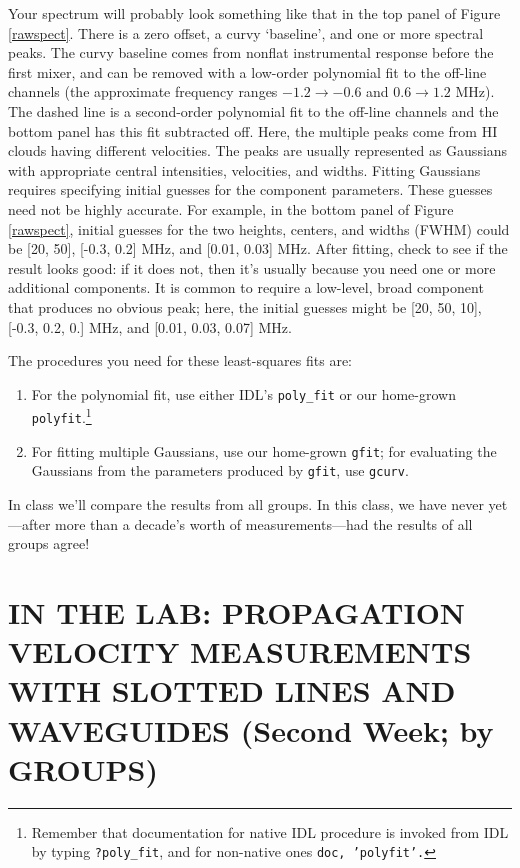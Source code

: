 \documentclass[12pt,preprint]{aastex}
\begin{document}
Your spectrum will probably look something like that in the top panel of
Figure \ref{rawspect}. There is a zero offset, a curvy `baseline', and
one or more spectral peaks. The curvy baseline comes from nonflat
instrumental response before the first mixer, and can be removed with a
low-order polynomial fit to the off-line channels (the approximate
frequency ranges $-1.2 \rightarrow -0.6$ and $ 0.6 \rightarrow 1.2$
MHz). The dashed line is a second-order polynomial fit to the off-line
channels and the bottom panel has this fit subtracted off.  Here, the
multiple peaks come from HI clouds having different velocities. The
peaks are usually represented as Gaussians with appropriate central
intensities, velocities, and widths.  Fitting Gaussians requires
specifying initial guesses for the component parameters. These guesses
need not be highly accurate. For example, in the bottom panel of Figure
\ref{rawspect}, initial guesses for the two heights, centers, and widths
(FWHM) could be [20, 50], [-0.3, 0.2] MHz, and [0.01, 0.03] MHz.  After
fitting, check to see if the result looks good: if it does not, then
it's usually because you need one or more additional components. It is
common to require a low-level, broad component that produces no obvious
peak; here, the initial guesses might be [20, 50, 10], [-0.3, 0.2, 0.]
MHz, and [0.01, 0.03, 0.07] MHz. 

The procedures you need for these least-squares fits
are: \begin{enumerate}
\item For the polynomial fit, use either IDL's {\tt poly\_fit} or our
  home-grown {\tt polyfit}.\footnote{Remember that documentation for
    native IDL procedure is invoked from IDL by typing {\tt ?poly\_fit},
    and for non-native ones {\tt doc, 'polyfit'.}}

\item For fitting multiple Gaussians, use our home-grown {\tt gfit}; for
  evaluating the Gaussians from the parameters produced by {\tt gfit},
  use {\tt gcurv}.
\end{enumerate}

In class we'll compare the results from all groups. In this class, we
have never yet---after more than a decade's worth of measurements---had
the results of all groups agree!

\section {IN THE LAB: PROPAGATION VELOCITY MEASUREMENTS WITH SLOTTED LINES AND 
WAVEGUIDES (Second Week; by GROUPS)} \label{expt}
\end{document}
